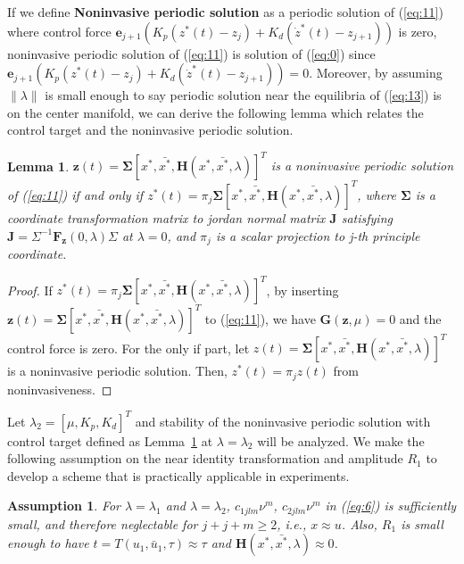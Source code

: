 \documentclass[openacc]{rsproca_new}%
\def\vec#1{\ensuremath{\mathbf{#1}}}
\newcommand{\Eref}[1]{(\ref{#1})}
\newcommand{\Lref}[1]{Lemma~\ref{#1}}
\newtheorem{lemma}{\bf Lemma}[section]
\newtheorem{assumption}{\bf Assumption}[section]
\begin{document}
\noindent If we define \textbf{Noninvasive periodic solution} as a periodic solution of \Eref{eq:11} where control force $\vec{e}_{j+1}(K_p(z^*(t)-z_j)+K_d(\dot z^*(t)-z_{j+1}))$ is zero, noninvasive periodic solution of \Eref{eq:11} is solution of \Eref{eq:0} since $\vec{e}_{j+1}(K_p(z^*(t)-z_j)+K_d(\dot z^*(t)-z_{j+1}))=0$. Moreover, by assuming $\| \lambda \|$ is small enough to say periodic solution near the equilibria of \Eref{eq:13} is on the center manifold, we can derive the following lemma which relates the control target and the noninvasive periodic solution.

\begin{lemma}\label{l1}
$\vec{z}(t)=\vec{\Sigma}[x^*,\bar {x^*},\vec H(x^*,\bar {x^*},\lambda)]^T$ is a noninvasive periodic solution of \Eref{eq:11} if and only if $z^*(t)=\pi_j \vec{\Sigma}[x^*,\bar {x^*},\vec H(x^*,\bar {x^*},\lambda)]^T$,
where $\vec{\Sigma}$ is a coordinate transformation matrix to jordan normal matrix $\vec{J}$ satisfying $\vec{J}=\Sigma^{-1}\vec{F}_\vec{z}(0,\lambda) \Sigma$ at $\lambda=0$, and $\pi_j$ is a scalar projection to j-th principle coordinate.
\end{lemma}

\begin{proof}
If $z^*(t)=\pi_j \vec{\Sigma}[x^*,\bar {x^*},\vec H(x^*,\bar {x^*},\lambda)]^T$, by inserting $\vec z(t)=\vec{\Sigma}[x^*,\bar {x^*},\vec H(x^*,\bar {x^*},\lambda)]^T$ to \Eref{eq:11}, we have $\vec{G}(\vec{z},\mu)=0$ and the control force is zero. For the only if part, let $z(t)=\vec{\Sigma}[x^*,\bar {x^*},\vec H(x^*,\bar {x^*},\lambda)]^T$ is a noninvasive periodic solution. Then, $z^*(t)=\pi_j z(t)$ from noninvasiveness.
\end{proof}

\noindent Let $\lambda_2=[\mu,K_p,K_d]^T$ and stability of the noninvasive periodic solution with control target defined as \Lref{l1} at $\lambda=\lambda_2$ will be analyzed. We make the following assumption on the near identity transformation and amplitude $R_1$ to develop a scheme that is practically applicable in experiments.

\begin{assumption}\label{a1}
For $\lambda=\lambda_1$ and $\lambda=\lambda_2$, $c_{1jlm}\nu^m$, $c_{2jlm}\nu^m$ in \Eref{eq:6} is sufficiently small, and therefore neglectable for $j+j+m\geq 2$, i.e., $x \approx u$. Also, $R_1$ is small enough to have $t=T(u_1,\bar u_1,\tau) \approx \tau$ and $\vec H(x^*,\bar {x^*},\lambda) \approx 0$.
\end{assumption}
\end{document}
